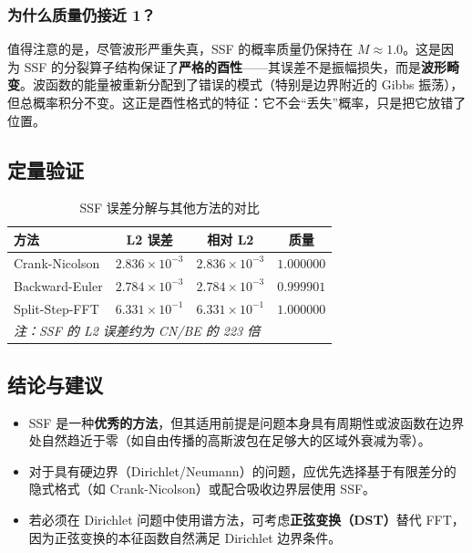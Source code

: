 \documentclass[12pt, a4paper]{article}
\begin{document}
\subsubsection{为什么质量仍接近 1？}

值得注意的是，尽管波形严重失真，SSF 的概率质量仍保持在 $M \approx 1.0$。这是因为 SSF 的分裂算子结构保证了\textbf{严格的酉性}——其误差不是振幅损失，而是\textbf{波形畸变}。波函数的能量被重新分配到了错误的模式（特别是边界附近的 Gibbs 振荡），但总概率积分不变。这正是酉性格式的特征：它不会``丢失''概率，只是把它放错了位置。

\subsection{定量验证}

\begin{table}[H]
\centering
\caption{SSF 误差分解与其他方法的对比}
\label{tab:ssf_compare}
\begin{tabular}{lccc}
\toprule
\textbf{方法} & \textbf{L2 误差} & \textbf{相对 L2} & \textbf{质量} \\
\midrule
Crank-Nicolson   & $2.836 \times 10^{-3}$ & $2.836 \times 10^{-3}$ & $1.000000$ \\
Backward-Euler   & $2.784 \times 10^{-3}$ & $2.784 \times 10^{-3}$ & $0.999901$ \\
Split-Step-FFT   & $6.331 \times 10^{-1}$ & $6.331 \times 10^{-1}$ & $1.000000$ \\
\midrule
\multicolumn{4}{l}{\textit{注：SSF 的 L2 误差约为 CN/BE 的 223 倍}} \\
\bottomrule
\end{tabular}
\end{table}

\subsection{结论与建议}

\begin{itemize}
    \item SSF 是一种\textbf{优秀的方法}，但其适用前提是问题本身具有周期性或波函数在边界处自然趋近于零（如自由传播的高斯波包在足够大的区域外衰减为零）。
    \item 对于具有硬边界（Dirichlet/Neumann）的问题，应优先选择基于有限差分的隐式格式（如 Crank-Nicolson）或配合吸收边界层使用 SSF。
    \item 若必须在 Dirichlet 问题中使用谱方法，可考虑\textbf{正弦变换（DST）}替代 FFT，因为正弦变换的本征函数自然满足 Dirichlet 边界条件。
\end{itemize}
\end{document}
